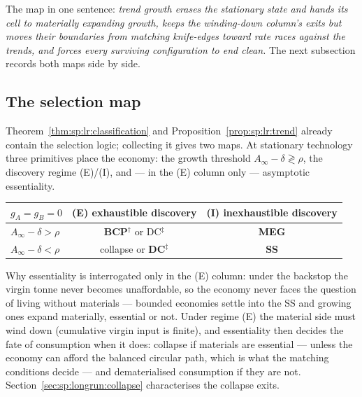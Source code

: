 The map in one sentence: \emph{trend growth erases the stationary state and hands its cell to
materially expanding growth, keeps the winding-down column's exits but moves their boundaries
from matching knife-edges toward rate races against the trends, and forces every surviving
configuration to end clean.} The next subsection records both maps side by side.

\subsection{The selection map}\label{sec:sp:longrun:selection}

Theorem~\ref{thm:sp:lr:classification} and Proposition~\ref{prop:sp:lr:trend} already contain
the selection logic; collecting it gives two maps. At stationary technology three primitives
place the economy: the growth threshold $A_\infty-\delta\gtrless\rho$, the
discovery regime (E)/(I), and --- in the (E) column only --- asymptotic essentiality.

\begin{center}
{\renewcommand{\arraystretch}{1.4}
\begin{tabular}{l|cc}
$g_A=g_B=0$ & (E) exhaustible discovery & (I) inexhaustible discovery \\
\hline
$A_\infty-\delta>\rho$ & \textbf{BCP}$^{\dagger}$ or DC$^{\ddagger}$ & \textbf{MEG} \\
$A_\infty-\delta<\rho$ & collapse or \textbf{DC}$^{\ddagger}$ & \textbf{SS} \\
\end{tabular}}
\end{center}


\medskip
Why essentiality is interrogated only in the (E) column: under the backstop the virgin tonne
never becomes unaffordable, so the economy never faces the question of living without materials
--- bounded economies settle into the SS and growing ones expand materially, essential or not.
Under regime (E) the material side must wind down (cumulative virgin input is finite), and
essentiality then decides the fate of consumption when it does: collapse if materials are
essential --- unless the economy can afford the balanced circular path, which is what the
matching conditions decide --- and dematerialised consumption if they are not.
Section~\ref{sec:sp:longrun:collapse} characterises the collapse exits.

